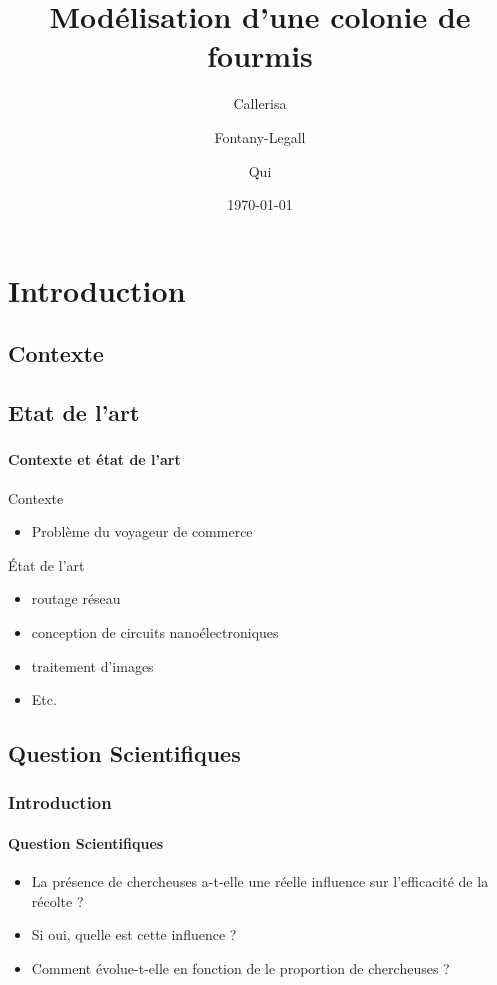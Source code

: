 \documentclass{beamer}
\author{Callerisa \and Fontany-Legall \and Qui}
\title{Modélisation d'une colonie de fourmis}
\institute{Université de Nice}
\date{\today}
\begin{document}
\begin{frame}

\titlepage
\end{frame}

\begin{frame}
\tableofcontents
\end{frame}


\section{Introduction}
\subsection{Contexte}
\subsection{Etat de l'art}
\begin{frame}
\frametitle{}
\framesubtitle{Contexte et état de l'art}
\begin{block}{Contexte}
\begin{itemize}
\item Problème du voyageur de commerce
\end{itemize}
\end{block}

\begin{block}{État de l'art}
\begin{itemize}
\item routage réseau
\item conception de circuits nanoélectroniques
\item traitement d'images
\item Etc.
\end{itemize}
\end{block}
\end{frame}

\subsection{Question Scientifiques}
\begin{frame}
\frametitle{Introduction}
\framesubtitle{Question Scientifiques}
\begin{itemize}
\item La présence de chercheuses a-t-elle une réelle influence sur l'efficacité de la récolte ?
\item Si oui, quelle est cette influence ?
\item Comment évolue-t-elle en fonction de le proportion de chercheuses ? 
\end{itemize}
\end{frame}
\end{document}
